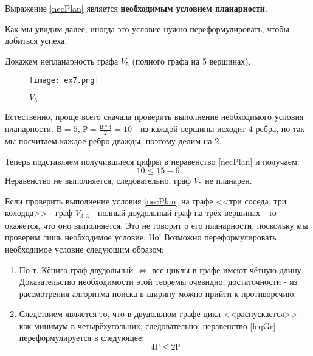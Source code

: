Выражение \ref{necPlan} является \textbf{необходимым условием планарности}.
\begin{notice}
    Как мы увидим далее, иногда это условие нужно переформулировать, чтобы добиться успеха.
\end{notice}
\newpage
\begin{problem}
    Докажем непланарность графа $V_5$ (полного графа на 5 вершинах).
\end{problem}
\begin{figure}[ht]
    \centering
    \texttt{[image: ex7.png]}

    \caption{$V_5$}
    \label{fig:V5}
\end{figure}
\begin{claim*}
    Естественно, проще всего сначала проверить выполнение необходимого условия планарности. 
    $В = 5$, $Р = \displaystyle\frac{В*4}{2} = 10$ - из каждой вершины исходит 4 ребра, но так мы посчитаем каждое ребро дважды, поэтому делим на $2$.
    
    Теперь подставляем получившиеся цифры в неравенство \ref{necPlan} и получаем:
    $$
    10 \leq 15-6
    $$
    Неравенство не выполняется, следовательно, граф $V_5$ не планарен.
\end{claim*}
\begin{notice}
Если проверить выполнение условия \ref{necPlan} на графе <<три соседа, три колодца>> - граф $V_{3,3}$ - полный двудольный граф на трёх вершинах - то окажется, что оно выполняется. Это не говорит о его планарности, поскольку мы проверим лишь необходимое условие. Но! Возможно переформулировать необходимое условие следующим образом:

\begin{enumerate}
    \item По т. Кёнига граф двудольный $\Leftrightarrow$ все циклы в графе имеют чётную длину. Доказательство необходимости этой теоремы очевидно, достаточности - из рассмотрения алгоритма поиска в ширину можно прийти к противоречию. 
    \item Следствием является то, что в двудольном графе цикл <<распускается>> как минимум в четырёхугольник, следовательно, неравенство \ref{leqGr} переформулируется в следующее:
    \begin{equation}
        4Г \leq 2Р
    \end{equation}
\end{enumerate}
\end{notice}

